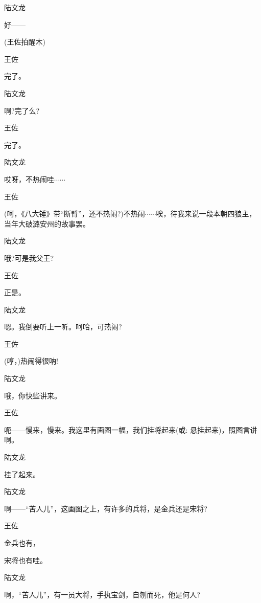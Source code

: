{{{陆文龙\hspace{20pt}~

好------}

{(王佐拍醒木)}

{王佐\hspace{30pt}~

完了。}

{陆文龙\hspace{20pt}~

啊?完了么?}

{王佐\hspace{30pt}~

完了。}

{陆文龙\hspace{20pt}~

哎呀，不热闹哇$\cdots{}\cdots{}$}

{王佐

(呵，《八大锤》带``断臂''，还不热闹?)不热闹$\cdots{}\cdots{}$唉，待我来说一段本朝四狼主，当年大破潞安州的故事罢。}

{陆文龙\hspace{20pt}~

哦?可是我父王?}

{王佐\hspace{30pt}~

正是。}

{陆文龙\hspace{20pt}~

嗯。我倒要听上一听。呵哈，可热闹?}

{王佐\hspace{30pt}~

(哼，)热闹得很呐!}

{陆文龙\hspace{20pt}~

哦，你快些讲来。}

{王佐

呃------慢来，慢来。我这里有画图一幅，我们挂将起来({\akai 或}: 悬挂起来)，照图言讲啊。}

{陆文龙\hspace{20pt}~

挂了起来。}

{陆文龙

啊------``苦人儿''，这画图之上，有许多的兵将，是金兵还是宋将?}

{王佐\hspace{30pt}~

金兵也有，}宋将也有哇。

{陆文龙

啊，``苦人儿''，有一员大将，手执宝剑，自刎而死，他是何人?}

}}
